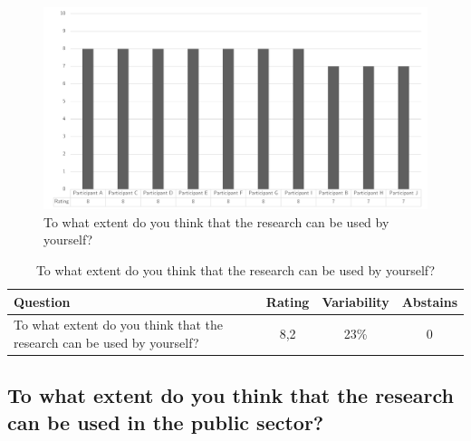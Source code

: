 \begin{figure}[H]
	\centering
	\includegraphics[width=0.9\linewidth]{images/validationresult_researchrelevanceexpert}
	\caption[To what extent do you think that the research can be used by yourself?]{To what extent do you think that the research can be used by yourself?}
	\label{fig:validationrelevantyourself}
\end{figure}
\begin{table}[H]
	\centering
	\begin{tabular}{p{}ccc}
		\toprule
		\textbf{Question} & \textbf{Rating} & \textbf{Variability} & \textbf{Abstains} \\
		\midrule
		To what extent do you think that the research can be used by yourself? & 8,2 & 23\% & 0 \\%
		\bottomrule
	\end{tabular}%
	\caption[To what extent do you think that the research can be used by yourself?]{To what extent do you think that the research can be used by yourself?}
	\label{tab:validationrelevantyourself}%
\end{table}%

\subsection{To what extent do you think that the research can be used in the public sector?}
\label{sub:validationrelevantps}

